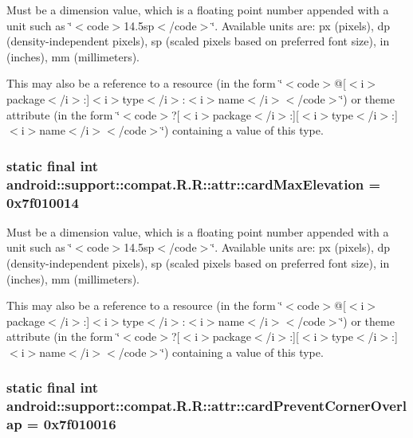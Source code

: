Must be a dimension value, which is a floating point number appended with a unit such as \char`\"{}$<$code$>$14.5sp$<$/code$>$\char`\"{}. Available units are: px (pixels), dp (density-independent pixels), sp (scaled pixels based on preferred font size), in (inches), mm (millimeters). 

This may also be a reference to a resource (in the form \char`\"{}$<$code$>$@\mbox{[}$<$i$>$package$<$/i$>$:\mbox{]}$<$i$>$type$<$/i$>$:$<$i$>$name$<$/i$>$$<$/code$>$\char`\"{}) or theme attribute (in the form \char`\"{}$<$code$>$?\mbox{[}$<$i$>$package$<$/i$>$:\mbox{]}\mbox{[}$<$i$>$type$<$/i$>$:\mbox{]}$<$i$>$name$<$/i$>$$<$/code$>$\char`\"{}) containing a value of this type. \hypertarget{classandroid_1_1support_1_1compat_1_1_r_1_1attr_309b697c31db08a8540383604f9668f4}{
\subsubsection[{cardMaxElevation}]{\setlength{\rightskip}{0pt plus 5cm}static final int android::support::compat.R.R::attr::cardMaxElevation = 0x7f010014}}
\label{classandroid_1_1support_1_1compat_1_1_r_1_1attr_309b697c31db08a8540383604f9668f4}


Must be a dimension value, which is a floating point number appended with a unit such as \char`\"{}$<$code$>$14.5sp$<$/code$>$\char`\"{}. Available units are: px (pixels), dp (density-independent pixels), sp (scaled pixels based on preferred font size), in (inches), mm (millimeters). 

This may also be a reference to a resource (in the form \char`\"{}$<$code$>$@\mbox{[}$<$i$>$package$<$/i$>$:\mbox{]}$<$i$>$type$<$/i$>$:$<$i$>$name$<$/i$>$$<$/code$>$\char`\"{}) or theme attribute (in the form \char`\"{}$<$code$>$?\mbox{[}$<$i$>$package$<$/i$>$:\mbox{]}\mbox{[}$<$i$>$type$<$/i$>$:\mbox{]}$<$i$>$name$<$/i$>$$<$/code$>$\char`\"{}) containing a value of this type. \hypertarget{classandroid_1_1support_1_1compat_1_1_r_1_1attr_18d6cc10a6f8b37660ba764a4bfaab04}{
\subsubsection[{cardPreventCornerOverlap}]{\setlength{\rightskip}{0pt plus 5cm}static final int android::support::compat.R.R::attr::cardPreventCornerOverlap = 0x7f010016}}
\label{classandroid_1_1support_1_1compat_1_1_r_1_1attr_18d6cc10a6f8b37660ba764a4bfaab04}



